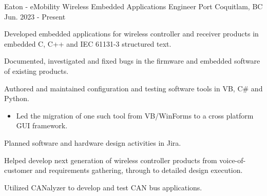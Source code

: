 


\begin{cventries}
    \cventry
    {Eaton - eMobility Wireless} %
    {Embedded Applications Engineer} %
    {Port Coquitlam, BC} %
    {Jun. 2023 - Present} %
    { %
        \begin{cvitems}
            \item {Developed embedded applications for wireless controller and receiver products in embedded C, C++ and IEC 61131-3 structured text.}
            \item {Documented, investigated and fixed bugs in the firmware and embedded software of existing products.}
            \item {Authored and maintained configuration and testing software tools in VB, C\# and Python.}
            \begin{itemize}
                \item {Led the migration of one such tool from VB/WinForms to a cross platform GUI framework.}
            \end{itemize}
            \item {Planned software and hardware design activities in Jira.}
            \item {Helped develop next generation of wireless controller products from voice-of-customer and requirements gathering, through to detailed design execution.}
            \item {Utilized CANalyzer to develop and test CAN bus applications. }
        \end{cvitems}
    }


\end{cventries}
